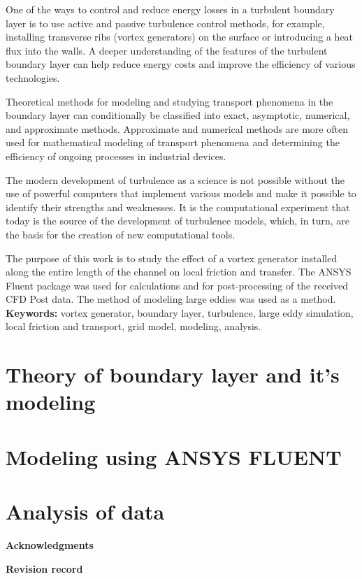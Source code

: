 \documentclass[12pt, a4paper]{article}
\begin{document}
	One of the ways to control and reduce energy losses in a turbulent boundary layer is to use active and passive turbulence control methods, for example, installing transverse ribs (vortex generators) on the surface or introducing a heat flux into the walls. A deeper understanding of the features of the turbulent boundary layer can help reduce energy costs and improve the efficiency of various technologies.
	
	Theoretical methods for modeling and studying transport phenomena in the boundary layer can conditionally be classified into exact, asymptotic, numerical, and approximate methods. Approximate and numerical methods are more often used for mathematical modeling of transport phenomena and determining the efficiency of ongoing processes in industrial devices.
	
	The modern development of turbulence as a science is not possible without the use of powerful computers that implement various models and make it possible to identify their strengths and weaknesses. It is the computational experiment that today is the source of the development of turbulence models, which, in turn, are the basis for the creation of new computational tools.
	
	The purpose of this work is to study the effect of a vortex generator installed along the entire length of the channel on local friction and transfer. The ANSYS Fluent package was used for calculations and for post-processing of the received CFD Post data. The method of modeling large eddies was used as a method.\\
	
	\textbf{Keywords:} vortex generator, boundary layer, turbulence, large eddy simulation, local friction and transport, grid model, modeling, analysis.\\	
	\newpage
	\section{Theory of boundary layer and it's modeling}
	
	\newpage
	\section{Modeling using ANSYS FLUENT}
	
	\newpage
	\section{Analysis of data}
	
	\newpage
	
	\newpage
	
	\newpage
	\begin{center}
		\Large\textbf{Acknowledgments}
	\end{center}
	\newpage
	\begin{center}
		\Large\textbf{Revision record}
	\end{center}
\end{document}
